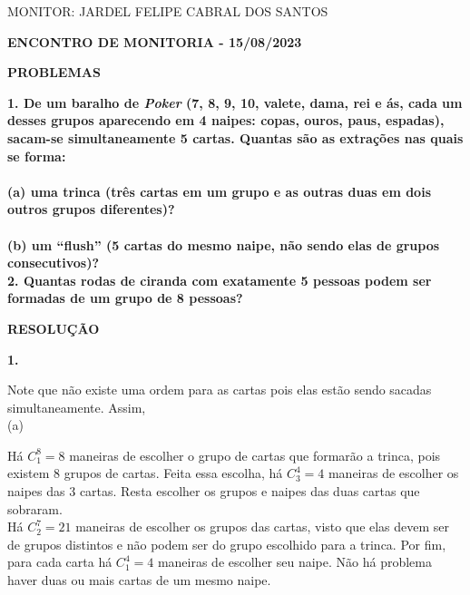 \documentclass[12pt, a4paper]{article}
\begin{document}
\begin{flushleft}

MONITOR: JARDEL FELIPE CABRAL DOS SANTOS\\[1cm] 
\end{flushleft}

\begin{center} \textbf{ENCONTRO DE MONITORIA - 15/08/2023\\[1cm]}
\end{center}

\begin{center}
\textbf{PROBLEMAS}
\end{center}

\textbf{1. De um baralho de \textit{Poker} (7, 8, 9, 10, valete, dama, rei e ás, cada um desses grupos aparecendo em 4 naipes: copas, ouros, paus, espadas), sacam-se simultaneamente 5 cartas. Quantas são as extrações nas quais se forma: \\ \\(a) uma trinca (três cartas em um grupo e as outras duas em dois outros grupos diferentes)? \\ \\(b) um ``flush''  (5 cartas do mesmo naipe, não sendo elas de grupos consecutivos)?} \\

\textbf{2. Quantas rodas de ciranda com exatamente 5 pessoas podem ser formadas de um grupo de 8 pessoas?} 

\begin{center}
\textbf{RESOLUÇÃO}
\end{center}

\textbf{1.}

Note que não existe uma ordem para as cartas pois elas estão sendo sacadas simultaneamente. Assim, \\

(a)

Há \(C^8_1 = 8\) maneiras de escolher o grupo de cartas que formarão a trinca, pois existem \(8\) grupos de cartas. Feita essa escolha, há \(C^4_3 = 4\) maneiras de escolher os naipes das \(3\) cartas.  Resta escolher os grupos e naipes das duas cartas que sobraram. \\

Há \(C^7_2 = 21\) maneiras de escolher os grupos das cartas, visto que elas devem ser de grupos distintos e não podem ser do grupo escolhido para a trinca. Por fim, para cada carta há \(C^4_1 = 4\) maneiras de escolher seu naipe. Não há problema haver duas ou mais cartas de um mesmo naipe. \\
\end{document}
